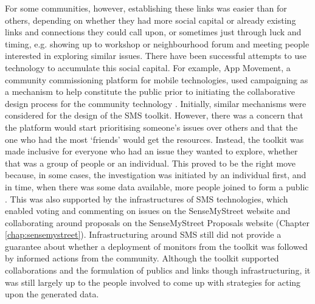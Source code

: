 For some communities, however, establishing these links was easier than for others, depending on whether they had more social capital or already existing links and connections they could call upon, or sometimes just through luck and timing, e.g. showing up to workshop or neighbourhood forum and meeting people interested in exploring similar issues. There have been successful attempts to use technology to accumulate this social capital. For example, App Movement, a community commissioning platform for mobile technologies, used campaigning as a mechanism to help constitute the public prior to initiating the collaborative design process for the community technology \citep{garbett_app_2016}. Initially, similar mechanisms were considered for the design of the SMS toolkit. However, there was a concern that the platform would start prioritising someone's issues over others and that the one who had the most `friends' would get the resources. Instead, the toolkit was made inclusive for everyone who had an issue they wanted to explore, whether that was a group of people or an individual. This proved to be the right move because, in some cases, the investigation was initiated by an individual first, and in time, when there was some data available, more people joined to form a public \citep{dewey_public_1954}. This was also supported by the infrastructures of SMS technologies, which enabled voting and commenting on issues on the SenseMyStreet website and collaborating around proposals on the SenseMyStreet Proposals website (Chapter \ref{chap:sensemystreet}). Infrastructuring around SMS still did not provide a guarantee about whether a deployment of monitors from the toolkit was followed by informed actions from the community. Although the toolkit supported collaborations and the formulation of publics and links though infrastructuring, it was still largely up to the people involved to come up with strategies for acting upon the generated data.


